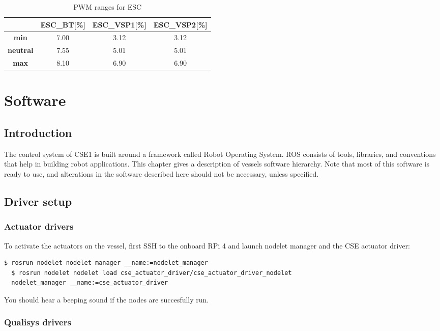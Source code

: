 \begin{table}[h!]
	\centering
	\caption{PWM ranges for ESC}
	\label{tab:pwm_range}
	\begin{tabular}{cccc}
		\hline
		& \textbf{ESC\_BT}[\%] & \textbf{ESC\_VSP1}[\%] & \textbf{ESC\_VSP2}[\%]\\ \hline
		\textbf{min} & 7.00 & 3.12 & 3.12\\
		\textbf{neutral} & 7.55 & 5.01 & 5.01\\
		\textbf{max} & 8.10 & 6.90 & 6.90\\ \hline
	\end{tabular}
\end{table}

\chapter{Software}
\section{Introduction}

The control system of CSE1 is built around a framework called Robot Operating System. ROS consists of tools, libraries, and conventions that help in building robot applications. This chapter gives a description of vessels software hierarchy. Note that most of this software is ready to use, and alterations in the software described here should not be necessary, unless specified.


\section{Driver setup}

\subsection{Actuator drivers}
To activate the actuators on the vessel, first SSH to the onboard RPi 4 and launch nodelet manager and the CSE actuator driver:
\begin{lstlisting}[language=bash,basicstyle=\mlttfamily, breaklines=true]
  $ rosrun nodelet nodelet manager __name:=nodelet_manager
  $ rosrun nodelet nodelet load cse_actuator_driver/cse_actuator_driver_nodelet  
  nodelet_manager __name:=cse_actuator_driver
\end{lstlisting}
You should hear a beeping sound if the nodes are succesfully run. 

\subsection{Qualisys drivers}

